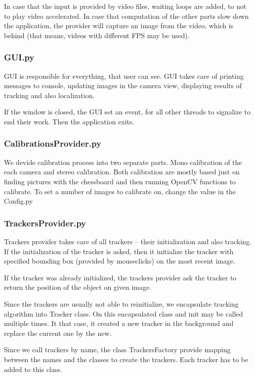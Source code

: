 In case that the input is provided by video files, waiting loops are added, to
not to play video accelerated. In case that computation of the other parts slow
down the application, the provider will capture an image from the video, which
is behind (that means, videos with different FPS may be used).

\subsubsection*{GUI.py}

GUI is responsible for everything, that user can see. GUI takes care of
printing messages to console, updating images in the camera view, displaying
results of tracking and also localization.

If the window is closed, the GUI set an event, for all other threads to
signalize to end their work. Then the application exits.

\subsubsection*{CalibrationsProvider.py}

We devide calibration process into two separate parts. Mono calibration of the
each camera and stereo calibration. Both calibration are mostly based just on
finding pictures with the chessboard and then running OpenCV functions to
calibrate. To set a number of images to calibrate on, change the value in the
Config.py

\subsubsection*{TrackersProvider.py}

Trackers provider takes care of all trackers -- their initialization and also
tracking. If the initialization of the tracker is asked, then it initialize the
tracker with specified bounding box (provided by mouseclicks) on the most
recent image.

If the tracker was already initialized, the trackers provider ask the tracker
to return the position of the object on given image.

Since the trackers are usually not able to reinitialize, we encapsulate
tracking algorithm into Tracker class. On this encapsulated class and init may
be called multiple times. It that case, it created a new tracker in the
background and replace the current one by the new.

Since we call trackers by name, the class TrackersFactory provide mapping
between the names and the classes to create the trackers. Each tracker has to
be added to this class.

